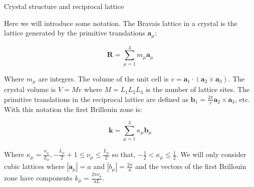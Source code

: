 \begin{subappendices}
\begin{section}{Crystal structure and reciprocal lattice}
\label{AP1A}

Here we will introduce some notation. The Bravais lattice in a crystal is the lattice generated by the primitive translations $\textbf{a}_\mu$:

\begin{equation}
\textbf{R} = \sum_{\mu=1}^3 m_\mu \textbf{a}_\mu
\end{equation}

Where $m_\mu$ are integers. The volume of the unit cell is $v = \textbf{a}_1 \cdot (\textbf{a}_2 \times \textbf{a}_3)$. The crystal volume is $V = Mv$ where $M = L_1 L_2 L_3$ is the number of lattice sites. The primitive translations in the reciprocal lattice are defined as $\textbf{b}_1 = \frac{2 \pi}{v}\textbf{a}_2 \times \textbf{a}_3$, etc. With this notation the first Brillouin zone is:

\begin{equation}
\textbf{k} = \sum_{\mu=1}^3 \kappa_\mu \textbf{b}_\mu
\end{equation}

Where $\kappa_\mu = \frac{\nu_\mu}{L_\mu}, -\frac{L_\mu}{2}+1 \leq \nu_\mu \leq \frac{L_\mu}{2}$ so that, $-\frac{1}{2} < \kappa_\mu \leq \frac{1}{2}$. We will only consider cubic lattices where $|\textbf{a}_\mu| = a$ and $|b_\mu| = \frac{2\pi}{a}$ and the vectors of the first Brillouin zone have components $k_\mu = \frac{2 \pi \nu_\mu}{aL}$.

\end{section}
\end{subappendices}

